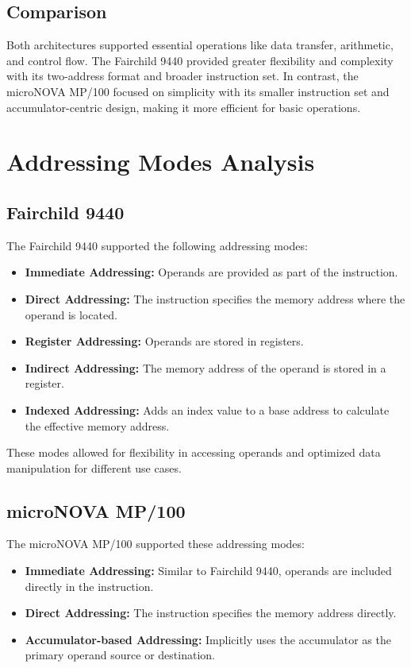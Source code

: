 \documentclass[a4paper,12pt]{article}
\begin{document}
\subsection{Comparison}

Both architectures supported essential operations like data transfer, arithmetic, and control flow. The Fairchild 9440 provided greater flexibility and complexity with its two-address format and broader instruction set. In contrast, the microNOVA MP/100 focused on simplicity with its smaller instruction set and accumulator-centric design, making it more efficient for basic operations.


\section{Addressing Modes Analysis}

\subsection{Fairchild 9440}

The Fairchild 9440 supported the following addressing modes:
\begin{itemize}
    \item \textbf{Immediate Addressing:} Operands are provided as part of the instruction.
    \item \textbf{Direct Addressing:} The instruction specifies the memory address where the operand is located.
    \item \textbf{Register Addressing:} Operands are stored in registers.
    \item \textbf{Indirect Addressing:} The memory address of the operand is stored in a register.
    \item \textbf{Indexed Addressing:} Adds an index value to a base address to calculate the effective memory address.
\end{itemize}

These modes allowed for flexibility in accessing operands and optimized data manipulation for different use cases.

\subsection{microNOVA MP/100}

The microNOVA MP/100 supported these addressing modes:
\begin{itemize}
    \item \textbf{Immediate Addressing:} Similar to Fairchild 9440, operands are included directly in the instruction.
    \item \textbf{Direct Addressing:} The instruction specifies the memory address directly.
    \item \textbf{Accumulator-based Addressing:} Implicitly uses the accumulator as the primary operand source or destination.
\end{itemize}
\end{document}
